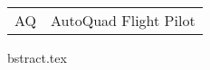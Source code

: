 \begin{table}[H]
\hspace{-9pt}	%
\begin{tabular}{p{} p{}} %
 AQ		&	AutoQuad Flight Pilot
\end{tabular}
\end{table}
bstract.tex
